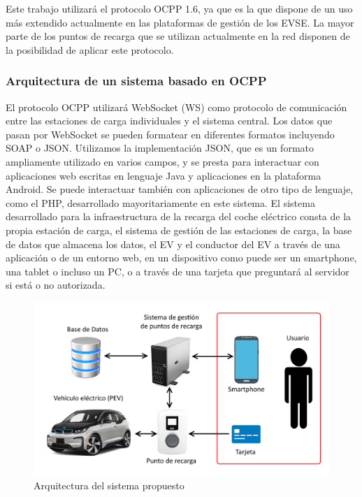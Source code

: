 \documentclass[12pt,a4paper,onecolumn,oneside]{report}
\begin{document}
Este trabajo utilizará el protocolo OCPP 1.6, ya que es la que dispone de un uso más extendido actualmente en las plataformas de gestión de los EVSE. La mayor parte de los puntos de recarga que se utilizan actualmente en la red disponen de la posibilidad de aplicar este protocolo.

\subsubsection{Arquitectura de un sistema basado en OCPP}
\label{Arquitectura de un sistema basado en OCPP}

El protocolo OCPP utilizará WebSocket (WS) como protocolo de comunicación entre las estaciones de carga individuales y el sistema central. Los datos que pasan por WebSocket se pueden formatear en diferentes formatos incluyendo SOAP o JSON. Utilizamos la implementación JSON, que es un formato ampliamente utilizado en varios campos, y se presta para interactuar con aplicaciones web escritas en lenguaje Java y aplicaciones en la plataforma Android. Se puede interactuar también con aplicaciones de otro tipo de lenguaje, como el PHP, desarrollado mayoritariamente en este sistema. El sistema desarrollado para la infraestructura de la recarga del coche eléctrico consta de la propia estación de carga, el sistema de gestión de las estaciones de carga, la base de datos que almacena los datos, el EV y el conductor del EV a través de una aplicación o de un entorno web, en un dispositivo como puede ser un smartphone, una tablet o incluso un PC, o a través de una tarjeta que preguntará al servidor si está o no autorizada.


\begin{figure}[H] 
\centering
  \includegraphics[width=.75\textwidth]{figuras/esquema.png}
  \caption[Arquitectura del sistema propuesto]{Arquitectura del sistema propuesto\\
  }
  \label{fig:arquitectura}
\end{figure}
\end{document}
